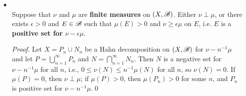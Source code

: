 \documentclass[11pt]{article}
\begin{document}
\begin{itemize}
\item \begin{lemma}\citep{folland2013real}\\
Suppose that $\nu$ and $\mu$ are \textbf{finite measures} on $(X,{\mathscr B})$. Either $\nu \perp \mu$, or there exists $\epsilon>0$ and $E\in {\mathscr B}$ such that  $\mu(E)>0$ and $\nu \ge \epsilon \mu$ on $E$, i.e. $E$ is a \textbf{positive set for $\nu-\epsilon \mu$}. 
\end{lemma}
\begin{proof}
Let $X= P_{n}\cup N_{n}$ be a Hahn decomposition on $(X, {\mathscr B})$ for $\nu- n^{-1}\mu$ and let $P = \bigcup_{n=1}^{\infty}P_{n}$ and $N= \bigcap_{n=1}^{\infty}N_{n}$. Then $N$ is a negative set for $\nu- n^{-1}\mu$ for all $n$, i.e., $0\le \nu(N)\le n^{-1}\mu(N)$ for all $n$, so $\nu(N)=0$. If $\mu(P)=0$, then $\nu \perp \mu$; if $\mu(P)>0$, then $\mu(P_{n})>0$ for some $n$, and $P_{n}$ is positive set for $\nu - n^{-1}\mu$.\qed
\end{proof}
 

\end{itemize}
\end{document}
